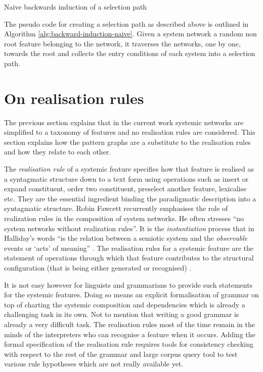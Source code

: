 \begin{algorithm}[!ht]
    \Input {\feature, \snet}
    \caption{Naive backwards induction of a selection path}
    \label{alg:backward-induction-naive}
\end{algorithm}

The pseudo code for creating a selection path as described above is outlined in Algorithm \ref{alg:backward-induction-naive}. Given a system network a random non root feature belonging to the network, it traverses the networks, one by one, towards the root and collects the entry conditions of each system into a selection path.

\section{On realisation rules}
\label{sec:realisation-reules}
The previous section explains that in the current work systemic networks are simplified to a taxonomy of features and no realisation rules are considered. This section explains how the pattern graphs are a substitute to the realisation rules and how they relate to each other.

The \textit{realisation rule} of a systemic feature specifies how that feature is realised as a syntagmatic structure down to a text form using operations such as insert or expand constituent, order two constituent, preselect another feature, lexicalise etc. They are the essential ingredient binding the paradigmatic description into a syntagmatic structure.
Robin Fawcett recurrently emphasises the role of realization rules in the composition of system networks. He often stresses ``no system networks without realization rules''.  
It is the \textit{instantiation} process that in Halliday's words ``is the relation between a semiotic system and the \textit{observable} events or `acts' of meaning'' \citep[emphasis added]{Halliday2003-systemic-theory}. The realisation rules for a systemic feature are the statement of operations through which that feature contributes to the structural configuration (that is being either generated or recognised) \citep[p.86]{Fawcett2000}.

It is not easy however for linguists and grammarians to provide such statements for the systemic features. Doing so means an explicit formalisation of grammar on top of charting the systemic composition and dependencies which is already a challenging task in its own. Not to mention that writing a good grammar is already a very difficult task. The realisation rules most of the time remain in the minds of the interpreters who can recognise a feature when it occurs. Adding the formal specification of the realisation rule requires tools for consistency checking with respect to the rest of the grammar and large corpus query tool to test various rule hypotheses which are not really available yet. 

